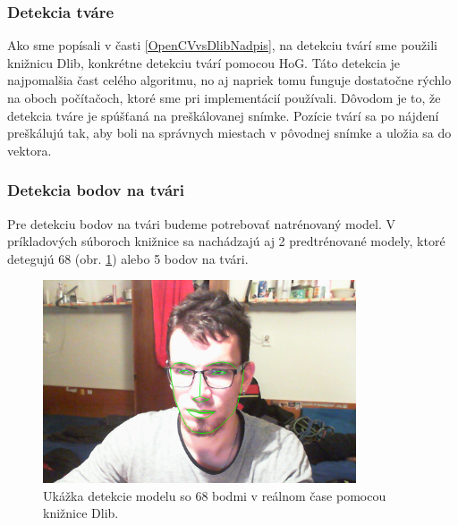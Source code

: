 \subsubsection{Detekcia tváre}\label{detekciaTvare}
Ako sme popísali v časti \ref{OpenCVvsDlibNadpis}, na detekciu tvárí sme použili knižnicu Dlib, konkrétne detekciu tvárí pomocou HoG. 
Táto detekcia je najpomalšia čast celého algoritmu, no aj napriek tomu funguje dostatočne rýchlo na oboch počítačoch, ktoré sme pri implementácií používali.
Dôvodom je to, že detekcia tváre je spúšťaná na preškálovanej snímke.
Pozície tvárí sa po nájdení preškálujú tak, aby boli na správnych miestach v pôvodnej snímke a uložia sa do vektora.

\subsubsection{Detekcia bodov na tvári}\label{detekciaBodov}
Pre detekciu bodov na tvári budeme potrebovať natrénovaný model. 
V príkladových súboroch knižnice sa nachádzajú aj 2 predtrénované modely, ktoré detegujú 68 (obr. \ref{pic-detekciaKsicht}) alebo 5 bodov na tvári. 

\begin{figure}[H]
	\begin{center}
		\includegraphics[height=6cm]{pics/detekciaKsicht.png}
		\caption{Ukážka detekcie modelu so 68 bodmi v reálnom čase pomocou knižnice Dlib.}
		\label{pic-detekciaKsicht}
	\end{center}
\end{figure}

